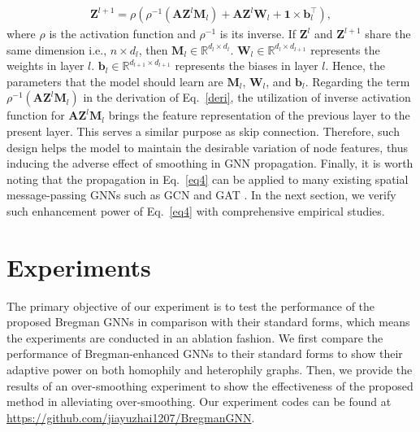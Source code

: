 \documentclass{article}
\begin{document}
\begin{equation} \label{eq4}
\begin{split}
\mathbf Z^{l+1} = \rho(\rho^{-1}(\mathbf A \mathbf Z^l \mathbf M_l)+\mathbf A \mathbf Z^l \mathbf W_l+\mathbf{1}\times \mathbf b_l^\top),
\end{split}
\end{equation}
where $\rho$ is the activation function and $\rho^{-1}$ is its inverse.
If $\mathbf Z^l$ and $\mathbf Z^{l+1}$ share the same dimension i.e., $n \times d_l$, then $\mathbf M_l \in \mathbb R^{d_l \times d_l}$. 
$\mathbf W_l \in \mathbb{R}^{d_{l}\times d_{l+1}}$ represents the weights in layer $l$.
$\mathbf b_l \in \mathbb{R}^{d_{l+1}\times d_{l+1}}$ represents the biases in layer $l$.
Hence, the parameters that the model should learn are $\mathbf M_l$, $\mathbf W_l$, and $\mathbf b_l$.
Regarding the term $\rho^{-1}(\mathbf A \mathbf Z^l \mathbf M_l)$ in the derivation of Eq.~\eqref{deri}, the utilization of inverse activation function for $\mathbf A \mathbf Z^l \mathbf M_l$ brings the feature representation of the previous layer to the present layer. This serves a similar purpose as skip connection. Therefore, such design helps the model to maintain the desirable variation of node features, thus inducing the adverse effect of smoothing in GNN propagation. Finally, it is worth noting that the propagation in Eq.~\eqref{eq4} can be applied to many existing spatial message-passing GNNs such as GCN \cite{kipf2017semisupervised} and GAT \cite{velivckovic2018graph}. In the next section, we verify such enhancement power of Eq.~\eqref{eq4} with comprehensive empirical studies. 


\section{Experiments}\label{Sec:3}
The primary objective of our experiment is to test the performance of the proposed Bregman GNNs in comparison with their standard forms, which means the experiments are conducted in an ablation fashion. 
We first compare the performance of Bregman-enhanced GNNs to their standard forms to show their adaptive power on both homophily and heterophily graphs.
Then, we provide the results of an over-smoothing experiment to show the effectiveness of the proposed method in alleviating over-smoothing. Our experiment codes can be found at \url{https://github.com/jiayuzhai1207/BregmanGNN}.
\end{document}
